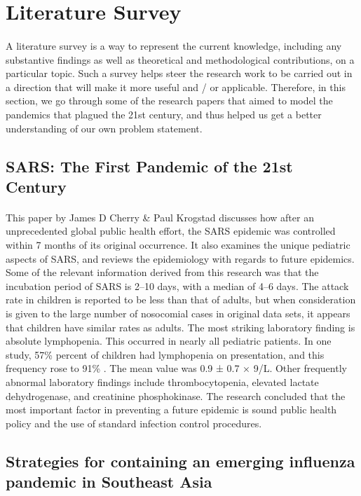 \documentclass[12pt, a4paper]{extarticle}
\begin{document}
    \newpage
    \section{Literature Survey}
	    \paragraph{} A literature survey is a way to represent the current knowledge, including any substantive findings as well as theoretical and methodological contributions, on a particular topic. Such a survey helps steer the research work to be carried out in a direction that will make it more useful and / or applicable. Therefore, in this section, we go through some of the research papers that aimed to model the pandemics that plagued the 21st century, and thus helped us get a better understanding of our own problem statement.
	    \subsection{SARS: The First Pandemic of the 21st Century}
	       \paragraph{} This paper by James D Cherry \& Paul Krogstad discusses how after an unprecedented global public health effort, the SARS epidemic was controlled within 7 months of its original occurrence. It also examines the unique pediatric aspects of SARS, and reviews the epidemiology with regards to future epidemics. Some of the relevant information derived from this research was that the incubation period of SARS is 2–10 days, with a median of 4–6 days. The attack rate in children is reported to be less than that of adults, but when consideration is given to the large number of nosocomial cases in original data sets, it appears that children have similar rates as adults. The most striking laboratory finding is absolute lymphopenia. This occurred in nearly all pediatric patients. In one study, 57\% percent of children had lymphopenia on presentation, and this frequency rose to 91\% . The mean value was 0.9 ± 0.7 × 9/L. Other frequently abnormal laboratory findings include thrombocytopenia, elevated lactate dehydrogenase, and creatinine phosphokinase. The research concluded that the most important factor in preventing a future epidemic is sound public health policy and the use of standard infection control procedures.
	    \subsection{Strategies for containing an emerging influenza pandemic in Southeast Asia}
\end{document}
